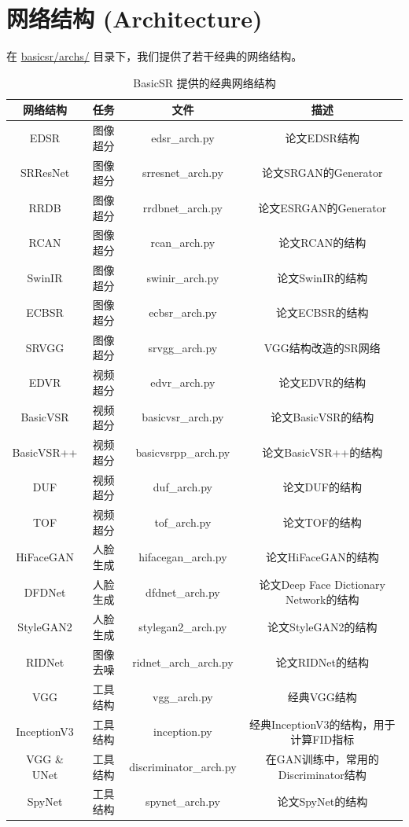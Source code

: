 \documentclass[../main.tex]{subfiles}
\begin{document}
\section{网络结构 (Architecture)} \label{code_structure:arch}
    在 \href{https://github.com/XPixelGroup/BasicSR/tree/master/basicsr/archs}{basicsr/archs/} 目录下，我们提供了若干经典的网络结构。
    \begin{table}[h]
    \centering
    {
    \begin{tabular}{|c|c|c|c|}
    \hline
    \textbf{网络结构} & \textbf{任务} & \textbf{文件} & \textbf{描述} \\ \hline
    EDSR & 图像超分 & edsr\_arch.py & 论文EDSR结构 \\ \hline
    SRResNet & 图像超分 & srresnet\_arch.py & 论文SRGAN的Generator \\ \hline
    RRDB & 图像超分 & rrdbnet\_arch.py & 论文ESRGAN的Generator \\ \hline
    RCAN & 图像超分 & rcan\_arch.py & 论文RCAN的结构 \\ \hline
    SwinIR & 图像超分 & swinir\_arch.py & 论文SwinIR的结构 \\ \hline
    ECBSR & 图像超分 & ecbsr\_arch.py & 论文ECBSR的结构 \\ \hline
    SRVGG & 图像超分 & srvgg\_arch.py & VGG结构改造的SR网络 \\ \hline
    EDVR & 视频超分 & edvr\_arch.py & 论文EDVR的结构 \\ \hline
    BasicVSR & 视频超分 & basicvsr\_arch.py &  论文BasicVSR的结构\\ \hline
    BasicVSR++ & 视频超分 & basicvsrpp\_arch.py &  论文BasicVSR++的结构\\ \hline
    DUF & 视频超分 & duf\_arch.py &  论文DUF的结构\\ \hline
    TOF & 视频超分 & tof\_arch.py &  论文TOF的结构\\ \hline
    HiFaceGAN & 人脸生成 & hifacegan\_arch.py &  论文HiFaceGAN的结构\\ \hline
    DFDNet & 人脸生成 & dfdnet\_arch.py &  论文Deep Face Dictionary Network的结构\\ \hline
    StyleGAN2  & 人脸生成 & stylegan2\_arch.py &  论文StyleGAN2的结构 \\ \hline
    RIDNet  & 图像去噪 & ridnet\_arch\_arch.py &  论文RIDNet的结构 \\ \hline
    VGG  & 工具结构 & vgg\_arch.py &  经典VGG结构 \\ \hline
    InceptionV3  & 工具结构 & inception.py &  经典InceptionV3的结构，用于计算FID指标 \\ \hline
    VGG \& UNet  & 工具结构 & discriminator\_arch.py &  在GAN训练中，常用的Discriminator结构 \\ \hline
    SpyNet  & 工具结构 & spynet\_arch.py &  论文SpyNet的结构 \\ \hline
    \end{tabular}
    }
    \caption{BasicSR 提供的经典网络结构}
    \end{table}
\end{document}
